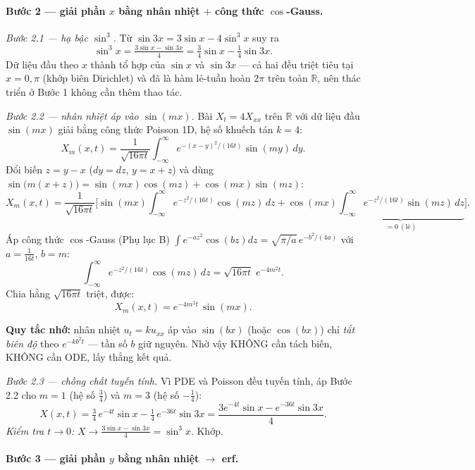 \paragraph{Bước 2 --- giải phần $x$ bằng nhân nhiệt $+$ công thức $\cos$-Gauss.}\leavevmode

\emph{Bước 2.1 --- hạ bậc $\sin^3$.} Từ $\sin 3x=3\sin x-4\sin^3 x$ suy ra
\[
  \sin^3 x=\tfrac{3\sin x-\sin 3x}{4}=\tfrac34\sin x-\tfrac14\sin 3x.
\]
Dữ liệu đầu theo $x$ thành tổ hợp của $\sin x$ và $\sin 3x$ --- cả hai đều triệt tiêu tại $x=0,\pi$ (khớp biên Dirichlet) và đã là hàm lẻ-tuần hoàn $2\pi$ trên toàn $\mathbb{R}$, nên thác triển ở Bước 1 không cần thêm thao tác.

\emph{Bước 2.2 --- nhân nhiệt áp vào $\sin(mx)$.} Bài $X_t=4X_{xx}$ trên $\mathbb{R}$ với dữ liệu đầu $\sin(mx)$ giải bằng công thức Poisson 1D, hệ số khuếch tán $k=4$:
\[
  X_m(x,t)=\frac{1}{\sqrt{16\pi t}}\int_{-\infty}^{\infty} e^{-(x-y)^2/(16t)}\sin(my)\,dy.
\]
Đổi biến $z=y-x$ ($dy=dz$, $y=x+z$) và dùng $\sin\big(m(x+z)\big)=\sin(mx)\cos(mz)+\cos(mx)\sin(mz)$:
\[
  X_m(x,t)=\frac{1}{\sqrt{16\pi t}}\Big[\sin(mx)\!\int_{-\infty}^{\infty}\!e^{-z^2/(16t)}\cos(mz)\,dz+\cos(mx)\!\underbrace{\int_{-\infty}^{\infty}\!e^{-z^2/(16t)}\sin(mz)\,dz}_{=0\ (\text{lẻ})}\Big].
\]
Áp công thức $\cos$-Gauss (Phụ lục B) $\int e^{-az^2}\cos(bz)dz=\sqrt{\pi/a}\,e^{-b^2/(4a)}$ với $a=\tfrac{1}{16t}$, $b=m$:
\[
  \int_{-\infty}^{\infty} e^{-z^2/(16t)}\cos(mz)\,dz=\sqrt{16\pi t}\;e^{-4m^2 t}.
\]
Chia hằng $\sqrt{16\pi t}$ triệt, được:
\[
  X_m(x,t)=e^{-4m^2 t}\,\sin(mx).
\]

\begin{meobox}
\textbf{Quy tắc nhớ:} nhân nhiệt $u_t=k u_{xx}$ áp vào $\sin(bx)$ (hoặc $\cos(bx)$) chỉ \emph{tắt biên độ} theo $e^{-kb^2 t}$ --- tần số $b$ giữ nguyên. Nhờ vậy KHÔNG cần tách biến, KHÔNG cần ODE, lấy thẳng kết quả.
\end{meobox}

\emph{Bước 2.3 --- chồng chất tuyến tính.} Vì PDE và Poisson đều tuyến tính, áp Bước 2.2 cho $m=1$ (hệ số $\tfrac34$) và $m=3$ (hệ số $-\tfrac14$):
\[
  X(x,t)=\tfrac34\,e^{-4t}\sin x-\tfrac14\,e^{-36t}\sin 3x=\frac{3e^{-4t}\sin x-e^{-36t}\sin 3x}{4}.
\]
\emph{Kiểm tra $t\to 0$:} $X\to\tfrac{3\sin x-\sin 3x}{4}=\sin^3 x$. Khớp.

\paragraph{Bước 3 --- giải phần $y$ bằng nhân nhiệt $\to$ erf.}\leavevmode

